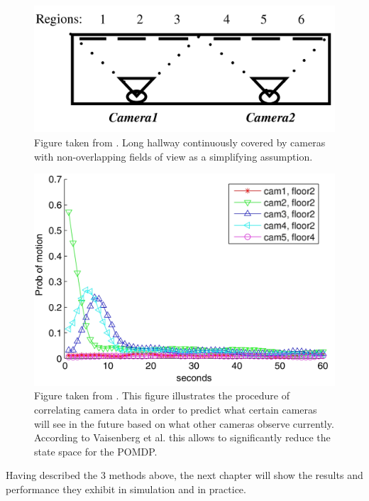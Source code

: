 \documentclass[a4paper,11pt,english]{article}
\begin{document}
\begin{figure}[t!]
  
  \centering
    \includegraphics[scale=0.1]{vaisenbergmethod1_highres.jpg}
    \caption{ Figure taken from \cite{vaisenberg2014scheduling}.
  Long hallway continuously covered by cameras with non-overlapping fields of view as a simplifying assumption.}
  \label{vaisenbergcameras}
\end{figure}

\begin{figure}[t!]
  
  \centering
    \includegraphics[scale=0.15]{vaisenbergmethod2_highres.jpg}
    \caption{ Figure taken from \cite{vaisenberg2014scheduling}.
  This figure illustrates the procedure of correlating camera data in order to predict what certain cameras will see in the future based on what other cameras observe currently. According to Vaisenberg et al. \cite{vaisenberg2014scheduling} this allows to significantly reduce the state space for the POMDP.}
  \label{vaisenbergcorrelation}
\end{figure}

Having described the 3 methods above, the next chapter will show the results and performance they exhibit in simulation and in practice.
\end{document}
